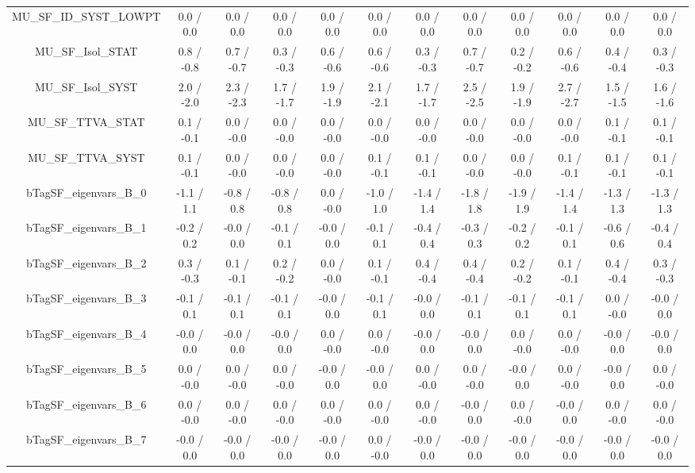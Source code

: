 \begin{table}[htbp]
\begin{center}
\begin{tabular}{|c|c|c|c|c|c|c|c|c|c|c|c|}
  MU_SF_ID_SYST_LOWPT & 0.0 / 0.0 & 0.0 / 0.0 & 0.0 / 0.0 & 0.0 / 0.0 & 0.0 / 0.0 & 0.0 / 0.0 & 0.0 / 0.0 & 0.0 / 0.0 & 0.0 / 0.0 & 0.0 / 0.0 & 0.0 / 0.0 \\ 
  MU_SF_Isol_STAT & 0.8 / -0.8 & 0.7 / -0.7 & 0.3 / -0.3 & 0.6 / -0.6 & 0.6 / -0.6 & 0.3 / -0.3 & 0.7 / -0.7 & 0.2 / -0.2 & 0.6 / -0.6 & 0.4 / -0.4 & 0.3 / -0.3 \\ 
  MU_SF_Isol_SYST & 2.0 / -2.0 & 2.3 / -2.3 & 1.7 / -1.7 & 1.9 / -1.9 & 2.1 / -2.1 & 1.7 / -1.7 & 2.5 / -2.5 & 1.9 / -1.9 & 2.7 / -2.7 & 1.5 / -1.5 & 1.6 / -1.6 \\ 
  MU_SF_TTVA_STAT & 0.1 / -0.1 & 0.0 / -0.0 & 0.0 / -0.0 & 0.0 / -0.0 & 0.0 / -0.0 & 0.0 / -0.0 & 0.0 / -0.0 & 0.0 / -0.0 & 0.0 / -0.0 & 0.1 / -0.1 & 0.1 / -0.1 \\ 
  MU_SF_TTVA_SYST & 0.1 / -0.1 & 0.0 / -0.0 & 0.0 / -0.0 & 0.0 / -0.0 & 0.1 / -0.1 & 0.1 / -0.1 & 0.0 / -0.0 & 0.0 / -0.0 & 0.1 / -0.1 & 0.1 / -0.1 & 0.1 / -0.1 \\ 
  bTagSF_eigenvars_B_0 & -1.1 / 1.1 & -0.8 / 0.8 & -0.8 / 0.8 & 0.0 / -0.0 & -1.0 / 1.0 & -1.4 / 1.4 & -1.8 / 1.8 & -1.9 / 1.9 & -1.4 / 1.4 & -1.3 / 1.3 & -1.3 / 1.3 \\ 
  bTagSF_eigenvars_B_1 & -0.2 / 0.2 & -0.0 / 0.0 & -0.1 / 0.1 & -0.0 / 0.0 & -0.1 / 0.1 & -0.4 / 0.4 & -0.3 / 0.3 & -0.2 / 0.2 & -0.1 / 0.1 & -0.6 / 0.6 & -0.4 / 0.4 \\ 
  bTagSF_eigenvars_B_2 & 0.3 / -0.3 & 0.1 / -0.1 & 0.2 / -0.2 & 0.0 / -0.0 & 0.1 / -0.1 & 0.4 / -0.4 & 0.4 / -0.4 & 0.2 / -0.2 & 0.1 / -0.1 & 0.4 / -0.4 & 0.3 / -0.3 \\ 
  bTagSF_eigenvars_B_3 & -0.1 / 0.1 & -0.1 / 0.1 & -0.1 / 0.1 & -0.0 / 0.0 & -0.1 / 0.1 & -0.0 / 0.0 & -0.1 / 0.1 & -0.1 / 0.1 & -0.1 / 0.1 & 0.0 / -0.0 & -0.0 / 0.0 \\ 
  bTagSF_eigenvars_B_4 & -0.0 / 0.0 & -0.0 / 0.0 & -0.0 / 0.0 & 0.0 / -0.0 & 0.0 / -0.0 & -0.0 / 0.0 & -0.0 / 0.0 & 0.0 / -0.0 & 0.0 / -0.0 & -0.0 / 0.0 & -0.0 / 0.0 \\ 
  bTagSF_eigenvars_B_5 & 0.0 / -0.0 & 0.0 / -0.0 & 0.0 / -0.0 & -0.0 / 0.0 & -0.0 / 0.0 & 0.0 / -0.0 & 0.0 / -0.0 & -0.0 / 0.0 & 0.0 / -0.0 & -0.0 / 0.0 & 0.0 / -0.0 \\ 
  bTagSF_eigenvars_B_6 & 0.0 / -0.0 & 0.0 / -0.0 & 0.0 / -0.0 & 0.0 / -0.0 & 0.0 / -0.0 & 0.0 / -0.0 & -0.0 / 0.0 & 0.0 / -0.0 & -0.0 / 0.0 & 0.0 / -0.0 & 0.0 / -0.0 \\ 
  bTagSF_eigenvars_B_7 & -0.0 / 0.0 & -0.0 / 0.0 & -0.0 / 0.0 & -0.0 / 0.0 & 0.0 / -0.0 & -0.0 / 0.0 & -0.0 / 0.0 & -0.0 / 0.0 & -0.0 / 0.0 & -0.0 / 0.0 & -0.0 / 0.0 \\ 

\end{tabular}
\end{center}
\end{table}
